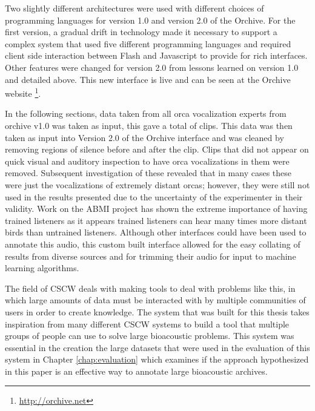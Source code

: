 Two slightly different architectures were used with different choices
of programming languages for version 1.0 and version 2.0 of the
Orchive.  For the first version, a gradual drift in technology made it
necessary to support a complex system that used five different
programming languages and required client side interaction between
Flash and Javascript to provide for rich interfaces.  Other features
were changed for version 2.0 from lessons learned on version 1.0 and
detailed above.  This new interface is live and can be seen at the Orchive
website
\footnote{\url{http://orchive.net}}.

In the following sections, data taken from all orca vocalization
experts from orchive v1.0 was taken as input, this gave a total of
\totalAnnotations clips.  This data was then taken as input into
Version 2.0 of the Orchive interface and was cleaned by removing
regions of silence before and after the clip.  Clips that did not
appear on quick visual and auditory inspection to have orca
vocalizations in them were removed.  Subsequent investigation of these
revealed that in many cases these were just the vocalizations of
extremely distant orcas; however, they were still not used in the
results presented due to the uncertainty of the experimenter in their
validity.  Work on the ABMI project has shown the extreme importance
of having trained listeners as it appears trained listeners can hear
many times more distant birds than untrained listeners.  Although
other interfaces could have been used to annotate this audio, this
custom built interface allowed for the easy collating of results from
diverse sources and for trimming their audio for input to machine
learning algorithms.

The field of CSCW \cite{bannon1991cscw} deals with making tools to
deal with problems like this, in which large amounts of data must be
interacted with by multiple communities of users in order to create
knowledge.  The system that was built for this thesis takes
inspiration from many different CSCW systems to build a tool that
multiple groups of people can use to solve large bioacoustic problems.
This system was essential in the creation the large datasets that were
used in the evaluation of this system in Chapter \ref{chap:evaluation}
which examines if the approach hypothesized in this paper is an
effective way to annotate large bioacoustic archives.

